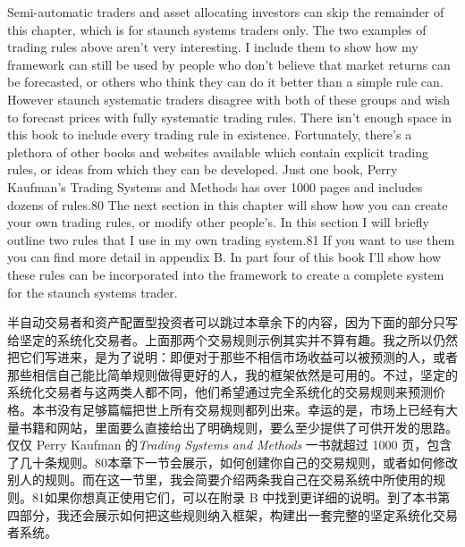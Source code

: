 \begin{englishblock} Semi-automatic traders and asset allocating investors can skip the remainder of this chapter, which is for staunch systems traders only. The two examples of trading rules above aren't very interesting. I include them to show how my framework can still be used by people who don't believe that market returns can be forecasted, or others who think they can do it better than a simple rule can. However staunch systematic traders disagree with both of these groups and wish to forecast prices with fully systematic trading rules. There isn't enough space in this book to include every trading rule in existence. Fortunately, there's a plethora of other books and websites available which contain explicit trading rules, or ideas from which they can be developed. Just one book, Perry Kaufman's Trading Systems and Methods has over 1000 pages and includes dozens of rules.80 The next section in this chapter will show how you can create your own trading rules, or modify other people's. In this section I will briefly outline two rules that I use in my own trading system.81 If you want to use them you can find more detail in appendix B. In part four of this book I'll show how these rules can be incorporated into the framework to create a complete system for the staunch systems trader. \end{englishblock}

\begin{chineseblock}半自动交易者和资产配置型投资者可以跳过本章余下的内容，因为下面的部分只写给坚定的系统化交易者。上面那两个交易规则示例其实并不算有趣。我之所以仍然把它们写进来，是为了说明：即便对于那些不相信市场收益可以被预测的人，或者那些相信自己能比简单规则做得更好的人，我的框架依然是可用的。不过，坚定的系统化交易者与这两类人都不同，他们希望通过完全系统化的交易规则来预测价格。本书没有足够篇幅把世上所有交易规则都列出来。幸运的是，市场上已经有大量书籍和网站，里面要么直接给出了明确规则，要么至少提供了可供开发的思路。仅仅 Perry Kaufman 的\textit{Trading Systems and Methods} 一书就超过 1000 页，包含了几十条规则。80本章下一节会展示，如何创建你自己的交易规则，或者如何修改别人的规则。而在这一节里，我会简要介绍两条我自己在交易系统中所使用的规则。81如果你想真正使用它们，可以在附录 B 中找到更详细的说明。到了本书第四部分，我还会展示如何把这些规则纳入框架，构建出一套完整的坚定系统化交易者系统。\end{chineseblock}


